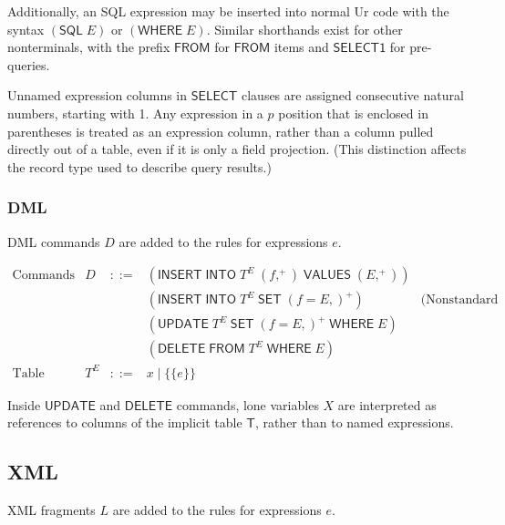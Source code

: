 \documentclass{article}
\newcommand{\mt}[1]{\mathsf{#1}}
\begin{document}
Additionally, an SQL expression may be inserted into normal Ur code with the syntax $(\mt{SQL} \; E)$ or $(\mt{WHERE} \; E)$.  Similar shorthands exist for other nonterminals, with the prefix $\mt{FROM}$ for $\mt{FROM}$ items and $\mt{SELECT1}$ for pre-queries.

Unnamed expression columns in $\mt{SELECT}$ clauses are assigned consecutive natural numbers, starting with 1.  Any expression in a $p$ position that is enclosed in parentheses is treated as an expression column, rather than a column pulled directly out of a table, even if it is only a field projection.  (This distinction affects the record type used to describe query results.)

\subsubsection{DML}

DML commands $D$ are added to the rules for expressions $e$.

$$\begin{array}{rrcll}
  \textrm{Commands} & D &::=& (\mt{INSERT} \; \mt{INTO} \; T^E \; (f,^+) \; \mt{VALUES} \; (E,^+)) \\
  &&& (\mt{INSERT} \; \mt{INTO} \; T^E \; \mt{SET} \; (f = E,)^+) & \textrm{(Nonstandard syntax extension)} \\
  &&& (\mt{UPDATE} \; T^E \; \mt{SET} \; (f = E,)^+ \; \mt{WHERE} \; E) \\
  &&& (\mt{DELETE} \; \mt{FROM} \; T^E \; \mt{WHERE} \; E) \\
  \textrm{Table expressions} & T^E &::=& x \mid \{\{e\}\}
\end{array}$$

Inside $\mt{UPDATE}$ and $\mt{DELETE}$ commands, lone variables $X$ are interpreted as references to columns of the implicit table $\mt{T}$, rather than to named expressions.

\subsection{XML}

XML fragments $L$ are added to the rules for expressions $e$.
\end{document}
